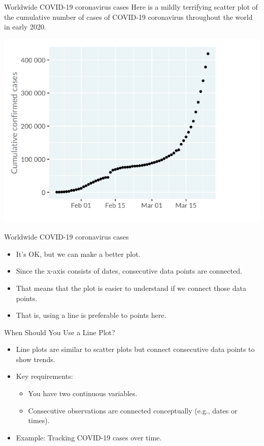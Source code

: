 \documentclass[
  ignorenonframetext,
]{beamer}
\begin{document}
\begin{frame}{Worldwide COVID-19 coronavirus cases}
\label{worldwide-covid-19-coronavirus-cases}
Here is a mildly terrifying scatter plot of the cumulative number of
cases of COVID-19 coronavirus throughout the world in early 2020.

\includegraphics{../images/im41.png}
\end{frame}

\begin{frame}{Worldwide COVID-19 coronavirus cases}
\label{worldwide-covid-19-coronavirus-cases-1}
\begin{itemize}
\item
  It's OK, but we can make a better plot.
\item
  Since the x-axis consists of dates, consecutive data points are
  connected.
\item
  That means that the plot is easier to understand if we connect those
  data points.
\item
  That is, using a line is preferable to points here.
\end{itemize}
\end{frame}

\begin{frame}{When Should You Use a Line Plot?}
\label{when-should-you-use-a-line-plot}
\begin{itemize}
\item
  Line plots are similar to scatter plots but connect consecutive data
  points to show trends.
\item
  Key requirements:

  \begin{itemize}
  \item
    You have two continuous variables.
  \item
    Consecutive observations are connected conceptually (e.g., dates or
    times).
  \end{itemize}
\item
  Example: Tracking COVID-19 cases over time.
\end{itemize}
\end{frame}
\end{document}
